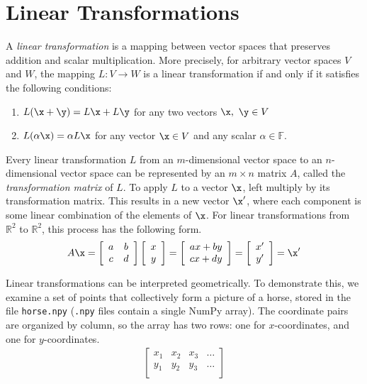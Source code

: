 \section*{Linear Transformations} %


A \emph{linear transformation} is a mapping between vector spaces that preserves addition and scalar multiplication.
More precisely, for arbitrary vector spaces $V$ and $W$, the mapping $L:V\rightarrow W$ is a linear transformation if and only if it satisfies the following conditions:
%
\begin{enumerate}
\item $L(\x + \y) = L\x + L\y$ for any two vectors $\x,\ \y \in V$
\item $L(\alpha\x) = \alpha L\x$ for any vector $\x \in V$ and any scalar $\alpha \in \mathbb{F}$.
\end{enumerate}

Every linear transformation $L$ from an $m$-dimensional vector space to an $n$-dimensional vector space can be represented by an $m\times n$ matrix $A$, called the \emph{transformation matrix} of $L$.
To apply $L$ to a vector $\x$, left multiply by its transformation matrix.
This results in a new vector $\x^\prime$, where each component is some linear combination of the elements of $\x$.
For linear transformations from $\mathbb{R}^2$ to $\mathbb{R}^2$, this process has the following form.
%
\begin{align*}
A\x =
\left[\begin{array}{cc}
a & b \\
c & d \\
\end{array}\right]
\left[\begin{array}{c}
x\\y
\end{array}\right]
=
\left[\begin{array}{cc}
ax + by \\cx + dy
\end{array}\right]
=
\left[\begin{array}{cc}
x^\prime \\y^\prime
\end{array}\right]
= \x^\prime
\end{align*}

Linear transformations can be interpreted geometrically.
To demonstrate this, we examine a set of points that collectively form a picture of a horse, stored in the file \texttt{horse.npy} (\texttt{.npy} files contain a single NumPy array).
The coordinate pairs are organized by column, so the array has two rows: one for $x$-coordinates, and one for $y$-coordinates.
%
\begin{align*}
\left[\begin{array}{cccc}
x_1 & x_2 & x_3 & \ldots \\
y_1 & y_2 & y_3 & \ldots \\
\end{array}\right]
\end{align*}

